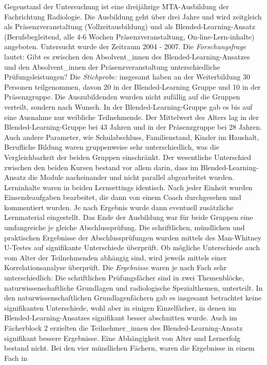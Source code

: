\documentclass[12pt, bibliography=totoc]{scrartcl}
\begin{document}
Gegenstand der Untersuchung ist eine dreijährige MTA-Ausbildung der
Fachrichtung Radiologie. Die Ausbildung geht über drei Jahre und wird
zeitgleich als Präsenzveranstaltung (Vollzeitausbildung) und als
Blended-Learning-Ansatz (Berufsbegleitend, alle 4-6 Wochen
Präsenzveranstaltung, On-line-Lern-inhalte) angeboten. Untersucht wurde
der Zeitraum 2004 - 2007. Die \emph{Forschungsfrage} lautet: Gibt es
zwischen den Absolvent\_innen des Blended-Learning-Ansatzes und den
Absolvent\_innen der Präsenzveranstaltung unterschiedliche
Prüfungsleistungen? Die \emph{Stichprobe:} insgesamt haben an der
Weiterbildung 30 Personen teilgenommen, davon 20 in der Blended-Learning
Gruppe und 10 in der Präsenzgruppe. Die Auszubildenden wurden nicht
zufällig auf die Gruppen verteilt, sondern nach Wunsch. In der
Blended-Learning-Gruppe gab es bis auf eine Ausnahme nur weibliche
Teilnehmende. Der Mittelwert des Alters lag in der
Blended-Learning-Gruppe bei 43 Jahren und in der Präsenzgruppe bei 28
Jahren. Auch andere Parameter, wie Schulabschluss, Familienstand, Kinder
im Haushalt, Berufliche Bildung waren gruppenweise sehr unterschiedlich,
was die Vergleichbarkeit der beiden Gruppen einschränkt. Der wesentliche
Unterschied zwischen den beiden Kursen bestand vor allem darin, dass im
Blended-Learning-Ansatz die Module nacheinander und nicht parallel
abgearbeitet wurden. Lerninhalte waren in beiden Lernsettings identisch.
Nach jeder Einheit wurden Einsendeaufgaben bearbeitet, die dann von
einem Coach durchgesehen und kommentiert wurden. Je nach Ergebnis wurde
dann eventuell zusätzliche Lernmaterial eingestellt. Das Ende der
Ausbildung war für beide Gruppen eine umfangreiche je gleiche
Abschlussprüfung. Die schriftlichen, mündlichen und praktischen
Ergebnisse der Abschlussprüfungen wurden mittels des Man-Whitney
U-Testes auf signifikante Unterschiede überprüft. Ob mögliche
Unterschiede auch vom Alter der Teilnehmenden abhängig sind, wird
jeweils mittels einer Korrelationsanalyse überprüft. Die
\emph{Ergebnisse} waren je nach Fach sehr unterschiedlich: Die
schriftlichen Prüfungsfächer sind in zwei Themenblöcke,
naturwissenschaftliche Grundlagen und radiologische Spezialthemen,
unterteilt. In den naturwissenschaftlichen Grundlagenfächern gab es
insgesamt betrachtet keine signifikanten Unterschiede, wohl aber in
einigen Einzelfächer, in denen im Blended-Learning-Ansatzes signifikant
besser abschnitten wurde. Auch im Fächerblock 2 erzielten die
Teilnehmer\_innen des Blended-Learning-Ansatz signifikant bessere
Ergebnisse. Eine Abhängigkeit von Alter und Lernerfolg bestand nicht.
Bei den vier mündlichen Fächern, waren die Ergebnisse in einem Fach in
\end{document}
